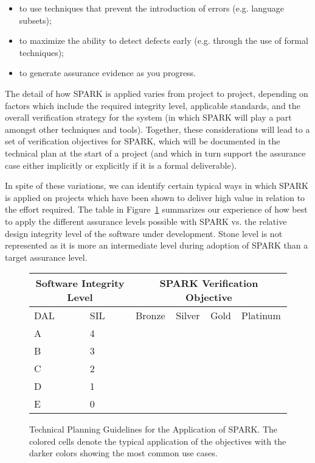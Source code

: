 \documentclass{llncs}
\begin{document}
\begin{itemize}
\item to use techniques that prevent the introduction of errors (e.g. language
  subsets);
\item to maximize the ability to detect defects early (e.g. through the use of
  formal techniques);
\item to generate assurance evidence as you progress.
\end{itemize}

The detail of how SPARK is applied varies from project to project, depending on
factors which include the required integrity level, applicable standards, and
the overall verification strategy for the system (in which SPARK will play a
part amongst other techniques and tools). Together, these considerations will
lead to a set of verification objectives for SPARK, which will be documented in
the technical plan at the start of a project (and which in turn support the
assurance case either implicitly or explicitly if it is a formal deliverable).

In spite of these variations, we can identify certain typical ways in which
SPARK is applied on projects which have been shown to deliver high value in
relation to the effort required. The table in Figure~\ref{fig:levels}
summarizes our experience of how best to apply the different assurance levels
possible with SPARK vs. the relative design integrity level of the software
under development.  Stone level is not represented as it is more an
intermediate level during adoption of SPARK than a target assurance level.

\begin{figure}

\begin{center}
\begin{tabular}{|p{1.5cm}|p{1.5cm}|p{1.5cm}|p{1.5cm}|p{1.5cm}|p{1.5cm}|} \hline
\multicolumn{2}{|c|}{Software Integrity Level} & \multicolumn{4}{c|}{SPARK Verification Objective} \\  \hline
DAL & SIL & Bronze & Silver & Gold & Platinum \\ \hline
A   & 4   &        & \cellcolor{OliveGreen} & \cellcolor{OliveGreen} & \cellcolor{OliveGreen} \\ \hline
B   & 3   &        & \cellcolor{OliveGreen} & \cellcolor{OliveGreen} & \cellcolor{YellowGreen} \\ \hline
C   & 2   &        & \cellcolor{NavyBlue} & \cellcolor{NavyBlue} & \\ \hline
D   & 1   &        & \cellcolor{NavyBlue} & \cellcolor{TealBlue} & \\ \hline
E   & 0   & \cellcolor{Orchid} & \cellcolor{Fuchsia} & & \\ \hline
\end{tabular}
\end{center}

\caption{Technical Planning Guidelines for the Application of SPARK.  The
  colored cells denote the typical application of the objectives with the
  darker colors showing the most common use cases.}
\label{fig:levels}
\end{figure}
\end{document}
